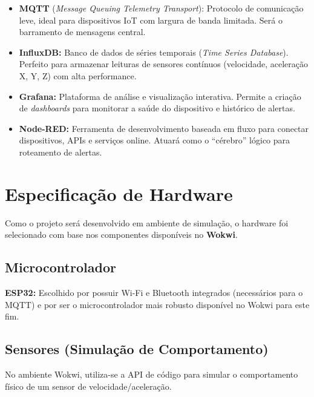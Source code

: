 \documentclass[a4paper,12pt]{article}
\begin{document}
\begin{itemize}[leftmargin=2cm]
    \item \textbf{MQTT} (\textit{Message Queuing Telemetry Transport}): Protocolo de comunicação leve, ideal para dispositivos IoT com largura de banda limitada. Será o barramento de mensagens central.

    \item \textbf{InfluxDB:} Banco de dados de séries temporais (\textit{Time Series Database}). Perfeito para armazenar leituras de sensores contínuos (velocidade, aceleração X, Y, Z) com alta performance.

    \item \textbf{Grafana:} Plataforma de análise e visualização interativa. Permite a criação de \textit{dashboards} para monitorar a saúde do dispositivo e histórico de alertas.

    \item \textbf{Node-RED:} Ferramenta de desenvolvimento baseada em fluxo para conectar dispositivos, APIs e serviços online. Atuará como o ``cérebro'' lógico para roteamento de alertas.
\end{itemize}

\section{Especificação de Hardware}

Como o projeto será desenvolvido em ambiente de simulação, o hardware foi selecionado com base nos componentes disponíveis no \textbf{Wokwi}.

\subsection{Microcontrolador}

\textbf{ESP32:} Escolhido por possuir Wi-Fi e Bluetooth integrados (necessários para o MQTT) e por ser o microcontrolador mais robusto disponível no Wokwi para este fim.

\subsection{Sensores (Simulação de Comportamento)}

No ambiente Wokwi, utiliza-se a API de código para simular o comportamento físico de um sensor de velocidade/aceleração.
\end{document}
